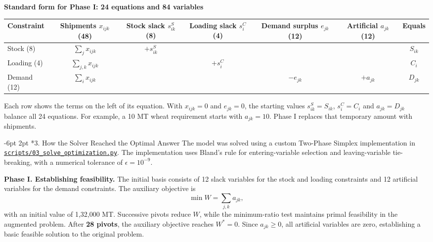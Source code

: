 \documentclass[10pt,a4paper]{article}
\makeatletter
\renewcommand{\arraystretch}{1.10}
\renewcommand\subsection{\@startsection{subsection}{2}{\z@}%
                                     {-6pt \@plus -2pt \@minus -1pt}%
                                     {2pt \@plus 1pt}%
                                     {\normalfont\large\bfseries}}
\makeatother
\begin{document}
\begin{center}
{\small\textbf{Standard form for Phase I: 24 equations and 84 variables}\par\smallskip}
{\footnotesize\renewcommand{\arraystretch}{1.35}%
\setlength{\tabcolsep}{5pt}
\begin{tabular}{lcccccc}
\toprule
\textbf{Constraint} &
\shortstack{\textbf{Shipments}\\$x_{ijk}$ (48)} &
\shortstack{\textbf{Stock slack}\\$s^S_{ik}$ (8)} &
\shortstack{\textbf{Loading slack}\\$s^C_i$ (4)} &
\shortstack{\textbf{Demand surplus}\\$e_{jk}$ (12)} &
\shortstack{\textbf{Artificial}\\$a_{jk}$ (12)} &
\textbf{Equals} \\
\midrule
Stock (8) & $\sum_j x_{ijk}$ & $+s^S_{ik}$ & & & & $S_{ik}$ \\
Loading (4) & $\sum_{j,k} x_{ijk}$ & & $+s^C_i$ & & & $C_i$ \\
Demand (12) & $\sum_{i} x_{ijk}$ & & & $-e_{jk}$ & $+a_{jk}$ & $D_{jk}$ \\
\bottomrule
\end{tabular}}
\end{center}
Each row shows the terms on the left of its equation. With $x_{ijk}=0$ and $e_{jk}=0$, the starting values $s^S_{ik}=S_{ik}$, $s^C_i=C_i$ and $a_{jk}=D_{jk}$ balance all 24 equations. For example, a 10 MT wheat requirement starts with $a_{jk}=10$. Phase I replaces that temporary amount with shipments.

\subsection*{3. How the Solver Reached the Optimal Answer}
The model was solved using a custom Two-Phase Simplex implementation in \href{https://github.com/abhitejj/CE637-Infra_Project/blob/main/scripts/03_solve_optimization.py}{\texttt{scripts/03\_solve\_optimization.py}}. The implementation uses Bland's rule for entering-variable selection and leaving-variable tie-breaking, with a numerical tolerance of $\epsilon=10^{-9}$.

\textbf{Phase I. Establishing feasibility.} The initial basis consists of 12 slack variables for the stock and loading constraints and 12 artificial variables for the demand constraints. The auxiliary objective is
\[
\min W=\sum_{j,k}a_{jk},
\]
with an initial value of 1,32,000 MT. Successive pivots reduce $W$, while the minimum-ratio test maintains primal feasibility in the augmented problem. After \textbf{28 pivots}, the auxiliary objective reaches $W^*=0$. Since $a_{jk}\ge0$, all artificial variables are zero, establishing a basic feasible solution to the original problem.
\end{document}
